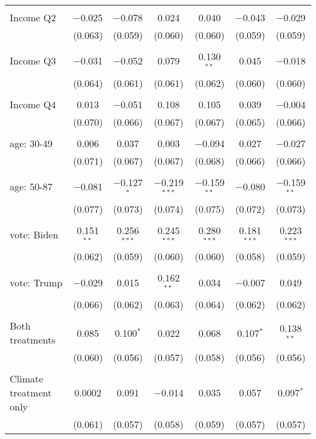\begin{tabular}{@{\extracolsep{5pt}}lcccccc}
  & & & & & & \\ 
 Income Q2 & $-$0.025 & $-$0.078 & 0.024 & 0.040 & $-$0.043 & $-$0.029 \\ 
  & (0.063) & (0.059) & (0.060) & (0.060) & (0.059) & (0.059) \\ 
  & & & & & & \\ 
 Income Q3 & $-$0.031 & $-$0.052 & 0.079 & 0.130$^{**}$ & 0.045 & $-$0.018 \\ 
  & (0.064) & (0.061) & (0.061) & (0.062) & (0.060) & (0.060) \\ 
  & & & & & & \\ 
 Income Q4 & 0.013 & $-$0.051 & 0.108 & 0.105 & 0.039 & $-$0.004 \\ 
  & (0.070) & (0.066) & (0.067) & (0.067) & (0.065) & (0.066) \\ 
  & & & & & & \\ 
 age: 30-49 & 0.006 & 0.037 & 0.003 & $-$0.094 & 0.027 & $-$0.027 \\ 
  & (0.071) & (0.067) & (0.067) & (0.068) & (0.066) & (0.066) \\ 
  & & & & & & \\ 
 age: 50-87 & $-$0.081 & $-$0.127$^{*}$ & $-$0.219$^{***}$ & $-$0.159$^{**}$ & $-$0.080 & $-$0.159$^{**}$ \\ 
  & (0.077) & (0.073) & (0.074) & (0.075) & (0.072) & (0.073) \\ 
  & & & & & & \\ 
 vote: Biden & 0.151$^{**}$ & 0.256$^{***}$ & 0.245$^{***}$ & 0.280$^{***}$ & 0.181$^{***}$ & 0.223$^{***}$ \\ 
  & (0.062) & (0.059) & (0.060) & (0.060) & (0.058) & (0.059) \\ 
  & & & & & & \\ 
 vote: Trump & $-$0.029 & 0.015 & 0.162$^{**}$ & 0.034 & $-$0.007 & 0.049 \\ 
  & (0.066) & (0.062) & (0.063) & (0.064) & (0.062) & (0.062) \\ 
  & & & & & & \\ 
 Both treatments & 0.085 & 0.100$^{*}$ & 0.022 & 0.068 & 0.107$^{*}$ & 0.138$^{**}$ \\ 
  & (0.060) & (0.056) & (0.057) & (0.058) & (0.056) & (0.056) \\ 
  & & & & & & \\ 
 Climate treatment only & 0.0002 & 0.091 & $-$0.014 & 0.035 & 0.057 & 0.097$^{*}$ \\ 
  & (0.061) & (0.057) & (0.058) & (0.059) & (0.057) & (0.057) \\ 

\end{tabular}
